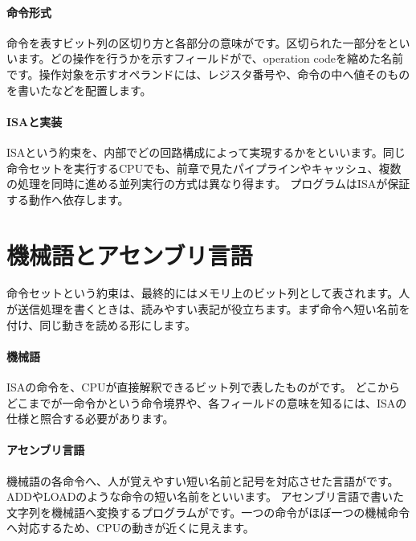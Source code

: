 \paragraph{命令形式}
        命令を表すビット列の区切り方と各部分の意味がです。区切られた一部分をといいます。どの操作を行うかを示すフィールドがで、operation codeを縮めた名前です。操作対象を示すオペランドには、レジスタ番号や、命令の中へ値そのものを書いたなどを配置します。

\par
\endgroup
\medskip
\begingroup
      \centering
      \vspace{4mm}
\paragraph{ISAと実装}
        ISAという約束を、内部でどの回路構成によって実現するかをといいます。同じ命令セットを実行するCPUでも、前章で見たパイプラインやキャッシュ、複数の処理を同時に進める並列実行の方式は異なり得ます。
        プログラムはISAが保証する動作へ依存します。

\par
\endgroup
\par
\endgroup


\section{機械語とアセンブリ言語}
\label{sec:02-language-02}

命令セットという約束は、最終的にはメモリ上のビット列として表されます。人が送信処理を書くときは、読みやすい表記が役立ちます。まず命令へ短い名前を付け、同じ動きを読める形にします。

\begingroup
\begingroup
\paragraph{機械語}
        ISAの命令を、CPUが直接解釈できるビット列で表したものがです。
        どこからどこまでが一命令かという命令境界や、各フィールドの意味を知るには、ISAの仕様と照合する必要があります。

\paragraph{アセンブリ言語}
        機械語の各命令へ、人が覚えやすい短い名前と記号を対応させた言語がです。ADDやLOADのような命令の短い名前をといいます。
        アセンブリ言語で書いた文字列を機械語へ変換するプログラムがです。一つの命令がほぼ一つの機械命令へ対応するため、CPUの動きが近くに見えます。

